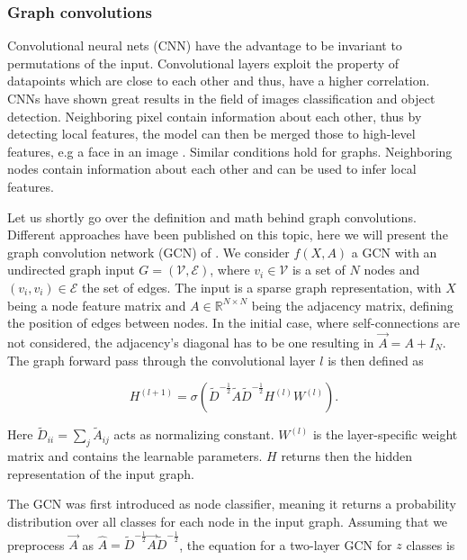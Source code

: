 \subsubsection{Graph convolutions}
\label{ssec:gcn}

Convolutional neural nets (CNN) have the advantage to be invariant to permutations of the input. Convolutional layers exploit the property of datapoints which are close to each other and thus, have a higher correlation. CNNs have shown great results in the field of images classification and object detection. Neighboring pixel contain information about each other, thus by detecting local features, the model can then be merged those to high-level features, e.g a face in an image \cite{bishop_pattern_2006}. Similar conditions hold for graphs. Neighboring nodes contain information about each other and can be used to infer local features. 

Let us shortly go over the definition and math behind graph convolutions. Different approaches have been published on this topic, here we will present the graph convolution network (GCN) of \cite{kipf_semi-supervised_2017}.
We consider $f(X,A)$ a GCN with an undirected graph input ${G}=(\mathcal{V}, \mathcal{E})$, where $v_{i} \in \mathcal{V}$ is a set of $N$ nodes and  $\left(v_{i}, v_{i}\right) \in \mathcal{E}$ the set of edges. The input is a sparse graph representation, with $X$ being a node feature matrix and $A \in \mathbb{R}^{N \times N}$ being the adjacency matrix, defining the position of edges between nodes. In the initial case, where self-connections are not considered, the adjacency's diagonal has to be one resulting in $\vec{A}=A+I_{N}$. The graph forward pass through the convolutional layer $l$ is then defined as

\begin{equation}
    H^{(l+1)}=\sigma\left(\tilde{D}^{-\frac{1}{2}} \tilde{A} \tilde{D}^{-\frac{1}{2}} H^{(l)} W^{(l)}\right).
\end{equation}

Here $\tilde{D}_{i i}=\sum_{j} \tilde{A}_{i j}$ acts as normalizing constant. $W^{(l)}$ is the layer-specific weight matrix and contains the learnable parameters. $H$ returns then the hidden representation of the input graph.

The GCN was first introduced as node classifier, meaning it returns a probability distribution over all classes for each node in the input graph. Assuming that we preprocess $\vec{A}$ as $\hat{A}=\tilde{D}^{-\frac{1}{2}} \vec{A} \tilde{D}^{-\frac{1}{2}}$, the equation for a two-layer GCN for $z$ classes is


